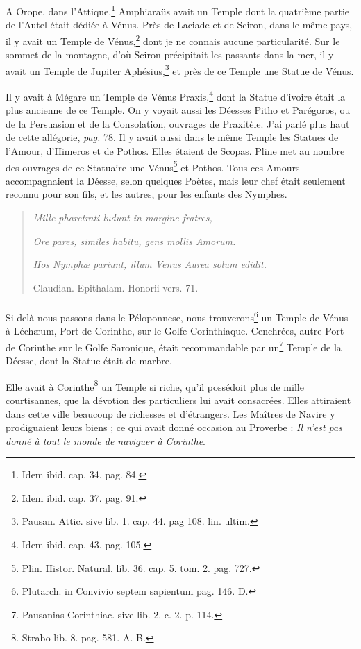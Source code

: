 \documentclass[a4paper, 11pt, oneside, polutonikogreek, french]{article}
\begin{document}
A Orope, dans l'Attique,\footnote{Idem ibid. cap. 34. pag. 84.} Amphiaraüs avait un Temple dont la quatrième partie de l'Autel était dédiée à Vénus. Près de Laciade et de Sciron, dans le même pays, il y avait un Temple de Vénus,\footnote{Idem ibid. cap. 37. pag. 91.} dont je ne connais aucune particularité. Sur le sommet de la montagne, d'où Sciron précipitait les passants dans la mer, il y avait un Temple de Jupiter Aphésius,\footnote{Pausan. Attic. sive lib. 1. cap. 44. pag 108. lin. ultim.} et près de ce Temple une Statue de Vénus.

Il y avait à Mégare un Temple de Vénus Praxis,\footnote{Idem ibid. cap. 43. pag. 105.} dont la Statue d'ivoire était la plus ancienne de ce Temple. On y voyait aussi les Déesses Pitho et Parégoros, ou de la Persuasion et de la Consolation, ouvrages de Praxitèle. J'ai parlé plus haut de cette allégorie, \emph{pag.} 78. Il y avait aussi dans le même Temple les Statues de l'Amour, d'Himeros et de Pothos. Elles étaient de Scopas. Pline met au nombre des ouvrages de ce Statuaire une Vénus\footnote{Plin. Histor. Natural. lib. 36. cap. 5. tom. 2. pag. 727.} et Pothos. Tous ces Amours accompagnaient la Déesse, selon quelques Poètes, mais leur chef était seulement reconnu pour son fils, et les autres, pour les enfants des Nymphes.
\begin{quotation}
\emph{Mille pharetrati ludunt in margine fratres,}

\emph{Ore pares, similes habitu, gens mollis Amorum.}

\emph{Hos Nymphæ pariunt, illum Venus Aurea solum edidit.}

\hspace*{30mm}Claudian. Epithalam. Honorii vers. 71.
\end{quotation}
\paragraph{}
Si delà nous passons dans le Péloponnese, nous trouverons\footnote{Plutarch. in Convivio septem sapientum pag. 146. D.} un Temple de Vénus à Léchæum, Port de Corinthe, sur le Golfe Corinthiaque. Cenchrées, autre Port de Corinthe sur le Golfe Saronique, était recommandable par un\footnote{Pausanias Corinthiac. sive lib. 2. c. 2. p. 114.} Temple de la Déesse, dont la Statue était de marbre.

Elle avait à Corinthe\footnote{Strabo lib. 8. pag. 581. A. B.} un Temple si riche, qu'il possédoit plus de mille courtisannes, que la dévotion des particuliers lui avait consacrées. Elles attiraient dans cette ville beaucoup de richesses et d'étrangers. Les Maîtres de Navire y prodiguaient leurs biens ; ce qui avait donné occasion au Proverbe : \emph{Il n'est pas donné à tout le monde de naviguer à Corinthe}.
\end{document}

